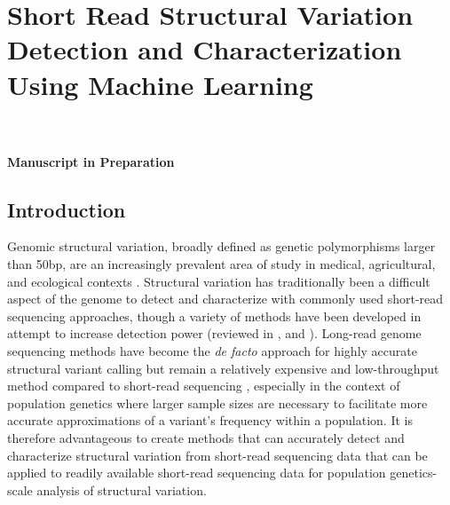 \chapter{Short Read Structural Variation Detection and Characterization Using Machine Learning}

\\
\\
\textbf{Manuscript in Preparation}

\section{Introduction}

Genomic structural variation, broadly defined as genetic polymorphisms larger than 50bp, are an increasingly prevalent area of study in medical, agricultural, and ecological contexts \cite{sudmantIntegratedMapStructural2015,duAnalysisStructuralVariants2021,weissensteinerDiscoveryPopulationGenomics2020,chakrabortyEvolutionGenomeStructure2021,chakrabortyHiddenGeneticVariation2018,merkerLongreadGenomeSequencing2018,bickhartChallengesImportanceStructural2014}. Structural variation has traditionally been a difficult aspect of the genome to detect and characterize with commonly used short-read sequencing approaches, though a variety of methods have been developed in attempt to increase detection power \cite{clealDysguEfficientStructural2022,rauschDELLYStructuralVariant2012,chenMantaRapidDetection2016,belyeuSamplotPlatformStructural2021,popicCueDeeplearningFramework2023}(reviewed in \cite{cameronComprehensiveEvaluationCharacterisation2019}, \cite{mahmoudStructuralVariantCalling2019} and \cite{alkanGenomeStructuralVariation2011}). Long-read genome sequencing methods have become the \textit{de facto} approach for highly accurate structural variant calling but remain a relatively expensive and low-throughput method compared to short-read sequencing \cite{merkerLongreadGenomeSequencing2018,dierckxsensBenchmarkStructuralVariation2021,chenDecipheringExactBreakpoints2023,ahsanSurveyAlgorithmsDetection2023,decosterPopulationscaleLongreadSequencing2021}, especially in the context of population genetics where larger sample sizes are necessary to facilitate more accurate approximations of a variant's frequency within a population. It is therefore advantageous to create methods that can accurately detect and characterize structural variation from short-read sequencing data that can be applied to readily available short-read sequencing data for population genetics-scale analysis of structural variation.

